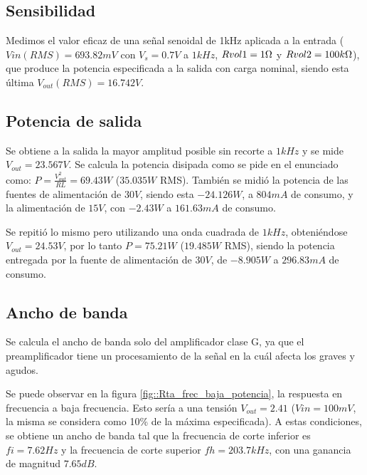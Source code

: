 \subsection{Sensibilidad}

\par Medimos el valor eficaz de una señal senoidal de 1kHz aplicada a la entrada ($Vin (RMS)=693.82mV$ con $V_s = 0.7V$ a $1kHz$, $Rvol1 = 1\ohm$ y $Rvol2 = 100k\ohm$), que produce la potencia especificada a la salida con carga nominal, siendo esta última $V_{out}(RMS)= 16.742V$. \\


\subsection{Potencia de salida}

\par Se obtiene a la salida la mayor amplitud posible sin recorte a $1kHz$ y se mide $V_{out}=23.567V$. Se calcula la potencia disipada como se pide en el enunciado como: $P = \frac{V_{out}^2}{RL} = 69.43W$ ($35.035W$ RMS). También se midió la potencia de las fuentes de alimentación de $30V$, siendo esta $-24.126W$, a $804mA$ de consumo, y la alimentación de $15V$, con $-2.43W$ a $161.63mA$ de consumo.

\par Se repitió lo mismo pero utilizando una onda cuadrada de $1kHz$, obteniéndose $V_{out} = 24.53V$, por lo tanto $P = 75.21W$ ($19.485W$ RMS), siendo la potencia entregada por la fuente de alimentación de $30V$, de $-8.905W$ a $296.83mA$ de consumo.

\subsection{Ancho de banda}

\par Se calcula el ancho de banda solo del amplificador clase G, ya que el preamplificador tiene un procesamiento de la señal en la cuál afecta los graves y agudos.

\par Se puede observar en la figura \ref{fig::Rta_frec_baja_potencia}, la respuesta en frecuencia a baja frecuencia. Esto sería a una tensión $V_{out}= 2.41$ ($Vin = 100mV$, la misma se considera como 10\% de la máxima especificada). A estas condiciones, se obtiene un ancho de banda tal que la frecuencia de corte inferior es $fi = 7.62Hz$ y la frecuencia de corte superior $fh = 203.7kHz$, con una ganancia de magnitud $7.65dB$.\\ 

